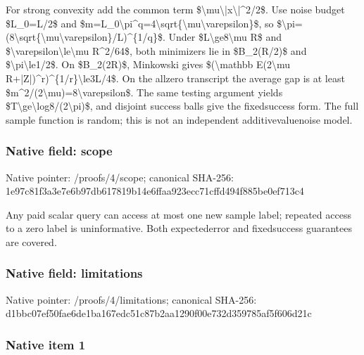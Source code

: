 \documentclass[10pt,a4paper]{article}
\begin{document}
For strong convexity add the common term \$\textbackslash{}mu\textbackslash{}|x\textbackslash{}|\textasciicircum{}2/2\$. Use noise budget \$L\_0=L/2\$ and \$m=L\_0\textbackslash{}pi\textasciicircum{}q=4\textbackslash{}sqrt\{\textbackslash{}mu\textbackslash{}varepsilon\}\$, so \$\textbackslash{}pi=(8\textbackslash{}sqrt\{\textbackslash{}mu\textbackslash{}varepsilon\}/L)\textasciicircum{}\{1/q\}\$. Under \$L\textbackslash{}ge8\textbackslash{}mu R\$ and \$\textbackslash{}varepsilon\textbackslash{}le\textbackslash{}mu R\textasciicircum{}2/64\$, both minimizers lie in \$B\_2(R/2)\$ and \$\textbackslash{}pi\textbackslash{}le1/2\$. On \$B\_2(2R)\$, Minkowski gives \$(\textbackslash{}mathbb E(2\textbackslash{}mu R+|Z|)\textasciicircum{}r)\textasciicircum{}\{1/r\}\textbackslash{}le3L/4\$. On the allzero transcript the average gap is at least \$m\textasciicircum{}2/(2\textbackslash{}mu)=8\textbackslash{}varepsilon\$. The same testing argument yields \$T\textbackslash{}ge\textbackslash{}log8/(2\textbackslash{}pi)\$, and disjoint success balls give the fixedsuccess form. The full sample function is random; this is not an independent additivevaluenoise model.


\subsubsection{Native field: scope}


Native pointer: /proofs/4/scope; canonical SHA-256: 1e97c81f3a3e7e6b97db6178\allowbreak{}19b14e6ffaa923ecc71cffd4\allowbreak{}94f885be0ef713c4


Any paid scalar query can access at most one new sample label; repeated access to a zero label is uninformative. Both expectederror and fixedsuccess guarantees are covered.


\subsubsection{Native field: limitations}


Native pointer: /proofs/4/limitations; canonical SHA-256: d1bbc07ef50fae6de1ba167e\allowbreak{}dc51c87b2aa1290f00e732d3\allowbreak{}59785af5f606d21c



\subsubsection{Native item 1}
\end{document}
